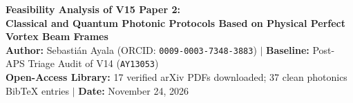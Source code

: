 \documentclass[10pt,letterpaper]{article}
\begin{document}
\begin{center}
  {\LARGE\bfseries\color{navy} Feasibility Analysis of V15 Paper 2:}\\[4pt]
  {\Large\bfseries\color{slate} Classical and Quantum Photonic Protocols Based on Physical Perfect Vortex Beam Frames}\\[8pt]
  {\small\color{slate}
    \textbf{Author:} Sebasti\'an Ayala (ORCID: \texttt{0009-0003-7348-3883}) \quad$|$\quad
    \textbf{Baseline:} Post-APS Triage Audit of V14 (\texttt{AY13053}) \\[2pt]
    \textbf{Open-Access Library:} 17 verified arXiv PDFs downloaded; 37 clean photonics BibTeX entries \quad$|$\quad
    \textbf{Date:} November 24, 2026
  }
\end{center}
\vspace{4pt}
\end{document}
